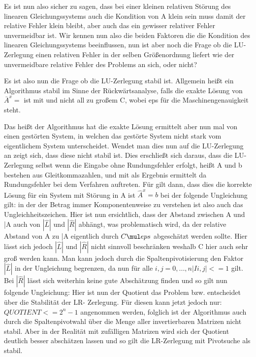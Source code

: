 \documentclass[course=erap]{aspdoc}
\begin{document}
Es ist nun also sicher zu sagen, dass bei einer kleinen relativen Störung des linearen 
Gleichungssystems auch die Kondition von A klein sein muss damit der relative Fehler 
klein bleibt, aber auch das ein gewisser relativer Fehler unvermeidbar ist.
Wir kennen nun also die beiden Faktoren die die Kondition des linearen 
Gleichungssystems beeinflussen, nun ist aber noch die Frage ob die LU-Zerlegung 
einen relativen Fehler in der selben Größenordnung liefert wie der unvermeidbare 
relative Fehler des Problems an sich, oder nicht?

Es ist also nun die Frage ob die LU-Zerlegung stabil ist. Allgemein heißt ein Algorithmus 
stabil im Sinne der Rückwärtsanalyse, falls  die exakte Lösung von $\bar{A}^x =$ ist mit 
  und nicht all zu großem C, wobei eps für die Maschinengenauigkeit steht.

Das heißt der Algorithmus hat die exakte Lösung ermittelt aber nun mal von einen
 gestörten System, in welchen das gestörte System nicht stark vom eigentlichem 
System unterscheidet.
Wendet man dies nun auf die LU-Zerlegung an zeigt sich, dass diese nicht stabil ist. 
Dies erschließt sich daraus, dass die LU-Zerlegung selbst wenn die Eingabe ohne 
Rundungsfehler erfolgt, heißt A und b bestehen aus Gleitkommazahlen,  und  mit 
 als Ergebnis ermittelt da Rundungsfehler bei dem Verfahren auftreten. Für  gilt 
dann, dass dies die korrekte Lösung für ein System mit Störung in A ist $\hat{A}^x=b$ bei der 
folgende Ungleichung gilt:   in der der 
Betrag immer Komponentenweise zu verstehen ist also auch das Ungleichheitszeichen.
Hier ist nun ersichtlich, dass der Abstand zwischen A und \bar{A} auch von $|\hat{L}|$ und $|\hat{R}|$
abhängt, was problematisch wird, da der relative Abstand von A zu \bar{A} eigentlich durch 
$C\mul eps$ abgeschätzt werden sollte. Hier lässt sich jedoch $|\hat{L}|$ und $|\hat{R}|$ nicht sinnvoll 
beschränken weshalb C hier auch sehr groß werden kann.
Man kann jedoch durch die Spaltenpivotisierung den Faktor $|\hat{L}|$ in der Ungleichung 
begrenzen, da nun für alle $i,j = 0,...,n |Ii,j| <= 1$ gilt. Bei $|\hat{R}|$ lässt sich weiterhin keine gute 
Abschätzung finden und so gilt nun folgende Ungleichung:  
Hier ist nun der Quotient das Problem bzw. entscheidet über die Stabilität der LR-
Zerlegung. Für diesen kann jetzt jedoch nur: $QUOTIENT <= 2^n-1$ angenommen 
werden, folglich ist der Algorithmus auch durch die Spaltenpivotwahl über die Menge 
aller invertierbaren Matrizen nicht stabil. Aber in der Realität mit zufälligen Matrizen wird 
sich der Quotient
 deutlich besser abschätzen lassen und so gilt die 
 LR-Zerlegung mit Pivotsuche als stabil.
\end{document}
